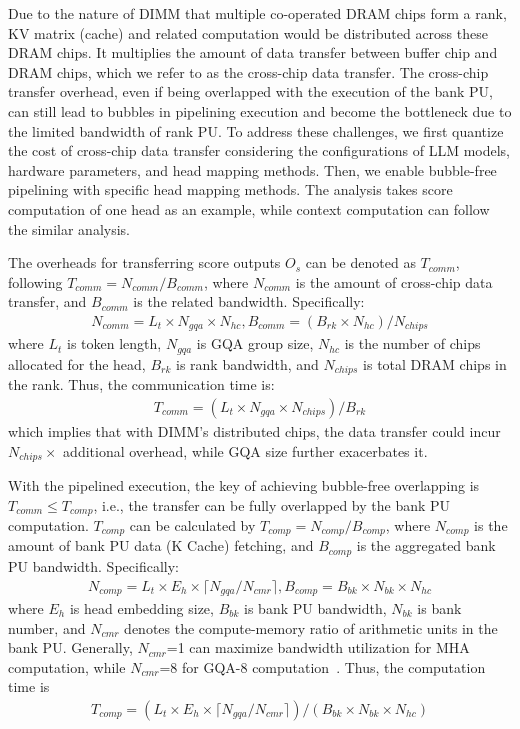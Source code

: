 \label{sec:design-dp-pipeline}
Due to the nature of DIMM that multiple co-operated DRAM chips form a rank,
KV matrix (cache) and related computation would be distributed across these DRAM chips.
It multiplies the amount of data transfer between buffer chip and DRAM chips, which we refer to as the cross-chip data transfer.
The cross-chip transfer overhead, even if being overlapped with the execution of the bank PU, 
can still lead to bubbles in pipelining execution and become the bottleneck due to the limited bandwidth of rank PU.
To address these challenges, 
we first quantize the cost of cross-chip data transfer considering the configurations of LLM models, hardware parameters, and head mapping methods.
Then, we enable bubble-free pipelining with specific head mapping methods.
The analysis takes score computation of one head as an example, while context computation can follow the similar analysis.

The overheads for transferring score outputs $O_s$ can be denoted as $T_{comm}$,
following $T_{comm} = {N_{comm}}/{B_{comm}}$, where $N_{comm}$ is the amount of cross-chip data transfer, and $B_{comm}$ is the related bandwidth.
Specifically:
\begin{align*}
  {N_{comm}}={L_t}\times{N_{gqa}}\times{N_{hc}}, {B_{comm}}=({B_{rk}}\times{N_{hc}})/N_{chips}
\end{align*}
where $L_t$ is token length, $N_{gqa}$ is GQA group size, $N_{hc}$ is the number of chips allocated for the head, $B_{rk}$ is rank bandwidth, and $N_{chips}$ is total DRAM chips in the rank.
Thus, the communication time is:
\begin{align*}
  {T_{comm}}=({L_t}\times{N_{gqa}}\times{N_{chips}})/{B_{rk}}
\end{align*}
which implies that with DIMM's distributed chips, the data transfer could incur $N_{chips}\times$ additional overhead, while GQA size further exacerbates it. 

With the pipelined execution, 
the key of achieving bubble-free overlapping is $T_{comm} \le T_{comp}$, i.e., the transfer can be fully overlapped by the bank PU computation.
$T_{comp}$ can be calculated by $T_{comp} = {N_{comp}}/{B_{comp}}$, where $N_{comp}$ is the amount of bank PU data (K Cache) fetching, and $B_{comp}$ is the aggregated bank PU bandwidth.
Specifically:
\begin{align*}
  {N_{comp}}={L_t}\times{E_{h}}\times \lceil {N_{gqa}}/{N_{cmr} \rceil}, {B_{comp}}={B_{bk}}\times{N_{bk}}\times{N_{hc}}
\end{align*}
where $E_{h}$ is head embedding size, $B_{bk}$ is bank PU bandwidth, $N_{bk}$ is bank number, and $N_{cmr}$ denotes the compute-memory ratio of arithmetic units in the bank PU. 
Generally, $N_{cmr}$=1 can maximize bandwidth utilization for MHA computation, while $N_{cmr}$=8 for GQA-8 computation~\cite{park2024attacc}.
Thus, the computation time is 
\begin{align*}
  {T_{comp}}=({L_t}\times{E_{h}}\times \lceil {N_{gqa}}/{N_{cmr}} \rceil)/({B_{bk}}\times{N_{bk}}\times{N_{hc}})
\end{align*}

